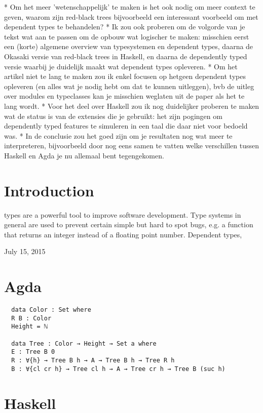 \documentclass[journal]{../IEEEtemplate/IEEEtran}
\begin{document}
* Om het meer 'wetenschappelijk' te maken is het ook nodig om meer context te geven, waarom zijn red-black trees bijvoorbeeld een interessant voorbeeld om met dependent types te behandelen?
* Ik zou ook proberen om de volgorde van je tekst wat aan te passen om de opbouw wat logischer te maken: misschien eerst een (korte) algemene overview van typesystemen en dependent types, daarna de Okasaki versie van red-black trees in Haskell, en daarna de dependently typed versie waarbij je duidelijk maakt wat dependent types opleveren.
* Om het artikel niet te lang te maken zou ik enkel focusen op hetgeen dependent types opleveren (en alles wat je nodig hebt om dat te kunnen uitleggen), bvb de uitleg over modules en typeclasses kan je misschien weglaten uit de paper als het te lang wordt.
* Voor het deel over Haskell zou ik nog duidelijker proberen te maken wat de status is van de extensies die je gebruikt: het zijn pogingen om dependently typed features te simuleren in een taal die daar niet voor bedoeld was.
* In de conclusie zou het goed zijn om je resultaten nog wat meer te interpreteren, bijvoorbeeld door nog eens samen te vatten welke verschillen tussen Haskell en Agda je nu allemaal bent tegengekomen.

\section{Introduction}
 types are a powerful tool to improve software
development.
Type systems in general are used to prevent certain simple but hard to spot
bugs, e.g. a function that returns an integer instead of a floating point
number.
Dependent types, 

\hfill July 15, 2015

\section{Agda}

\begin{verbatim}
  data Color : Set where
  R B : Color
  Height = ℕ

  data Tree : Color → Height → Set a where
  E : Tree B 0
  R : ∀{h} → Tree B h → A → Tree B h → Tree R h
  B : ∀{cl cr h} → Tree cl h → A → Tree cr h → Tree B (suc h)
\end{verbatim}

\section{Haskell}
\end{document}
